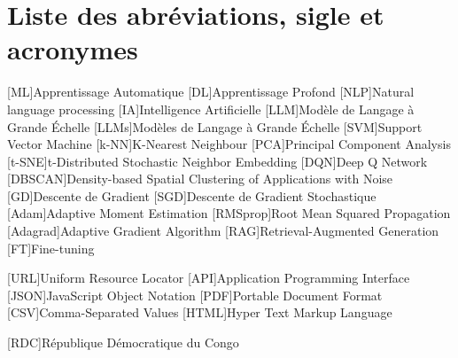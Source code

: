 

\chapter*{Liste des abréviations, sigle et acronymes}

\begin{acronym}[LLM]

[ML]{Apprentissage Automatique}
[DL]{Apprentissage Profond}
[NLP]{Natural language processing}
[IA]{Intelligence Artificielle}
[LLM]{Modèle de Langage à Grande Échelle}
[LLMs]{Modèles de Langage à Grande Échelle}
[SVM]{Support Vector Machine}
[k-NN]{K-Nearest Neighbour}
[PCA]{Principal Component Analysis}
[t-SNE]{t-Distributed Stochastic Neighbor Embedding}
[DQN]{Deep Q Network}
[DBSCAN]{Density-based Spatial Clustering of Applications with Noise}
[GD]{Descente de Gradient}
[SGD]{Descente de Gradient Stochastique}
[Adam]{Adaptive Moment Estimation}
[RMSprop]{Root Mean Squared Propagation}
[Adagrad]{Adaptive Gradient Algorithm}
[RAG]{Retrieval-Augmented Generation}
[FT]{Fine-tuning}

[URL]{Uniform Resource Locator}
[API]{Application Programming Interface}
[JSON]{JavaScript Object Notation}
[PDF]{Portable Document Format}
[CSV]{Comma-Separated Values}
[HTML]{Hyper Text Markup Language}

[RDC]{République Démocratique du Congo}
\end{acronym}  
                   
\endgroup
